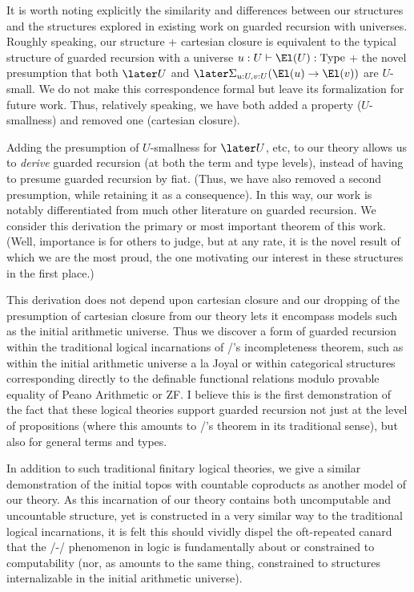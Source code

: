 It is worth noting explicitly the similarity and differences between our structures and the structures explored in existing work on guarded recursion with universes. Roughly speaking, our structure + cartesian closure is equivalent to the typical structure of guarded recursion with a universe $u : U \vdash \El(U) : \mathrm{Type}$ + the novel presumption that both $\later U$ and $\later \Sigma_{u : U, v : U} (\El(u) \to \El(v))$ are $U$-small. We do not make this correspondence formal but leave its formalization for future work. Thus, relatively speaking, we have both added a property ($U$-smallness) and removed one (cartesian closure).

Adding the presumption of $U$-smallness for $\later U$, etc, to our theory allows us to \emph{derive} guarded recursion (at both the term and type levels), instead of having to presume guarded recursion by fiat. (Thus, we have also removed a second presumption, while retaining it as a consequence). In this way, our work is notably differentiated from much other literature on guarded recursion. We consider this derivation the primary or most important theorem of this work. (Well, importance is for others to judge, but at any rate, it is the novel result of which we are the most proud, the one motivating our interest in these structures in the first place.)

This derivation does not depend upon cartesian closure and our dropping of the presumption of cartesian closure from our theory lets it encompass models such as the initial arithmetic universe. Thus we discover a form of guarded recursion within the traditional logical incarnations of \Goedel/'s incompleteness theorem, such as within the initial arithmetic universe a la Joyal or within categorical structures corresponding directly to the definable functional relations modulo provable equality of Peano Arithmetic or ZF. I believe this is the first demonstration of the fact that these logical theories support guarded recursion not just at the level of propositions (where this amounts to \Loeb/'s theorem in its traditional sense), but also for general terms and types.

In addition to such traditional finitary logical theories, we give a similar demonstration of the initial topos with countable coproducts as another model of our theory. As this incarnation of our theory contains both uncomputable and uncountable structure, yet is constructed in a very similar way to the traditional logical incarnations, it is felt this should vividly dispel the oft-repeated canard that the \Godel/-\Lob/ phenomenon in logic is fundamentally about or constrained to computability (nor, as amounts to the same thing, constrained to structures internalizable in the initial arithmetic universe).

